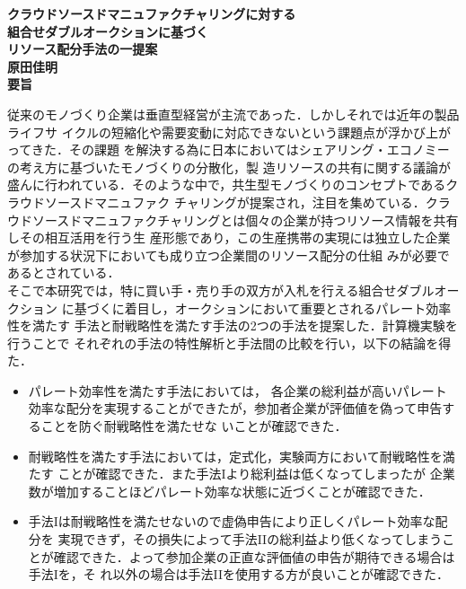 \newpage
\thispagestyle{empty}
\begin{center}
	\mbox{\LARGE{\bf{クラウドソースドマニュファクチャリングに対する}}} \\
	\mbox{\LARGE{\bf{組合せダブルオークションに基づく}}} \\
	\mbox{\LARGE{\bf{リソース配分手法の一提案}}} \\
	\vspace*{2mm}
	\mbox{\Large{\bf{原田佳明}}}\\
	\vspace*{7mm}
	{\LARGE\bf 要旨}
\end{center}\par
従来のモノづくり企業は垂直型経営が主流であった．しかしそれでは近年の製品ライフサ
イクルの短縮化や需要変動に対応できないという課題点が浮かび上がってきた．その課題
を解決する為に日本においてはシェアリング・エコノミーの考え方に基づいたモノづくりの分散化，製
造リソースの共有に関する議論が盛んに行われている．そのような中で，共生型モノづくりのコンセプトであるクラウドソースドマニュファク
チャリングが提案され，注目を集めている．クラウドソースドマニュファクチャリングとは個々の企業が持つリソース情報を共有しその相互活用を行う生
産形態であり，この生産携帯の実現には独立した企業が参加する状況下においても成り立つ企業間のリソース配分の仕組
みが必要であるとされている．\\
そこで本研究では，特に買い手・売り手の双方が入札を行える組合せダブルオークション
に基づくに着目し，オークションにおいて重要とされるパレート効率性を満たす
手法と耐戦略性を満たす手法の2つの手法を提案した．計算機実験を行うことで
それぞれの手法の特性解析と手法間の比較を行い，以下の結論を得た．
\begin{itemize}
\item パレート効率性を満たす手法においては， 各企業の総利益が高いパレート
  効率な配分を実現することができたが，参加者企業が評価値を偽って申告することを防ぐ耐戦略性を満たせな
  いことが確認できた．
\item 耐戦略性を満たす手法においては，定式化，実験両方において耐戦略性を満たす
ことが確認できた．また手法Iより総利益は低くなってしまったが
企業数が増加することほどパレート効率な状態に近づくことが確認できた．
\item 手法Iは耐戦略性を満たせないので虚偽申告により正しくパレート効率な配分を
  実現できず，その損失によって手法IIの総利益より低くなってしまうことが確認できた．よって参加企業の正直な評価値の申告が期待できる場合は手法Iを，そ
  れ以外の場合は手法IIを使用する方が良いことが確認できた．
\end{itemize}